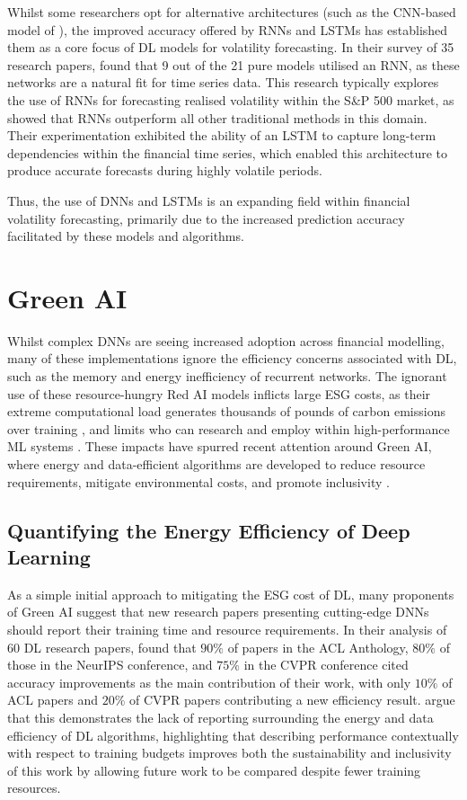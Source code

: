 \documentclass[a4paper, 11pt]{report}
\begin{document}
    Whilst some researchers opt for alternative architectures (such as the CNN-based model of \citet{chen-2018}), the improved accuracy offered by RNNs and LSTMs has established them as a core focus of DL models for volatility forecasting. In their survey of 35 research papers, \citet{ge-2022} found that 9 out of the 21 pure models utilised an RNN, as these networks are a natural fit for time series data. This research typically explores the use of RNNs for forecasting realised volatility within the S\&P 500 market, as \citet{bucci-2020} showed that RNNs outperform all other traditional methods in this domain. Their experimentation exhibited the ability of an LSTM to capture long-term dependencies within the financial time series, which enabled this architecture to produce accurate forecasts during highly volatile periods. 
    
    Thus, the use of DNNs and LSTMs is an expanding field within financial volatility forecasting, primarily due to the increased prediction accuracy facilitated by these models and algorithms.


    \section{Green AI}

    Whilst complex DNNs are seeing increased adoption across financial modelling, many of these implementations ignore the efficiency concerns associated with DL, such as the memory and energy inefficiency of recurrent networks. The ignorant use of these resource-hungry Red AI models inflicts large ESG costs, as their extreme computational load generates thousands of pounds of carbon emissions over training \citep{strubell-2019}, and limits who can research and employ within high-performance ML systems \citep{bender-2021}. These impacts have spurred recent attention around Green AI, where energy and data-efficient algorithms are developed to reduce resource requirements, mitigate environmental costs, and promote inclusivity \citep{schwartz-2019}.


    \subsection{Quantifying the Energy Efficiency of Deep Learning}

    As a simple initial approach to mitigating the ESG cost of DL, many proponents of Green AI suggest that new research papers presenting cutting-edge DNNs should report their training time and resource requirements. In their analysis of 60 DL research papers, \citet{schwartz-2019} found that $90\%$ of papers in the ACL Anthology, $80\%$ of those in the NeurIPS conference, and $75\%$ in the CVPR conference cited accuracy improvements as the main contribution of their work, with only $10\%$ of ACL papers and $20\%$ of CVPR papers contributing a new efficiency result. \citet{schwartz-2019} argue that this demonstrates the lack of reporting surrounding the energy and data efficiency of DL algorithms, highlighting that describing performance contextually with respect to training budgets improves both the sustainability and inclusivity of this work by allowing future work to be compared despite fewer training resources.
\end{document}
